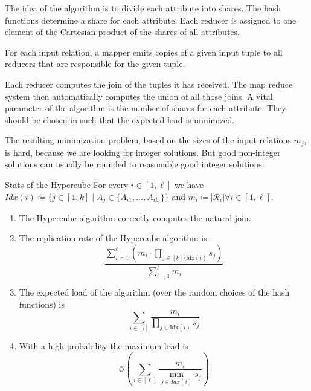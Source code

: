 \documentclass[english]{panikzettel}
\begin{document}
\begin{halfboxl}
\vspace{-\baselineskip}
	The idea of the algorithm is to divide each attribute into shares.
	The hash functions determine a share for each attribute.
	Each reducer is assigned to one element of the Cartesian product of the shares of all attributes.

	For each input relation, a mapper emits copies of a given input tuple to all reducers that are responsible for the given tuple.

	Each reducer computes the join of the tuples it has received. The map reduce system then automatically computes the union of all those joins.
	A vital parameter of the algorithm is the number of shares for each attribute. They should be chosen in such that the expected load is minimized.

	The resulting minimization problem, based on the sizes of the input relations $m_j$, is hard, because we are looking for integer solutions.
	But good non-integer solutions can usually be rounded to reasonable good integer solutions.
\end{halfboxl}
\begin{halfboxr}
\vspace{-\baselineskip}
	\begin{theo}{Stats of the Hypercube}
	For every $i\in[1,\ell]$ we have\\ $Idx(i) \coloneqq \{j\in [1,k] \mid A_j\in \{A_{i1},...,A_{ik_{i}} \} \}$ and $m_i\coloneqq | \mathcal{R}_i| \forall i\in [1,\ell]$.
	\begin{enumerate}[leftmargin=*]
	    \item The Hypercube algorithm correctly computes the natural join.
	    \item The replication rate of the Hypercube algorithm is:
	$$
	\frac{\displaystyle \sum_{i=1}^\ell \left( m_i\cdot \prod_{j \in [k]\setminus \text{Idx}(i)} s_j \right)}{\displaystyle \sum_{i = 1}^\ell m_i }
	$$
		\item The expected load of the algorithm (over the random choices of the hash functions) is
	$$
	\sum_{i \in [l]} \frac{m_i}{\prod_{j \in \text{Idx}(i)} s_j}
	$$
		\item With a high probability the maximum load is
		\[
		\mathcal{O}\left( \sum_{i\in[\ell]} \frac{m_i}{\min_{j\in Idx(i)} s_j} \right)
		\]
	\end{enumerate}
	\end{theo}
\end{halfboxr}
\end{document}
